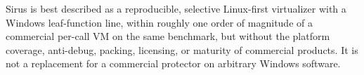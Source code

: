 Sirus is best described as a reproducible, selective Linux-first virtualizer
with a Windows leaf-function line, within roughly one order of magnitude of a
commercial per-call VM on the same benchmark, but without the platform coverage,
anti-debug, packing, licensing, or maturity of commercial products. It is not a
replacement for a commercial protector on arbitrary Windows software.
